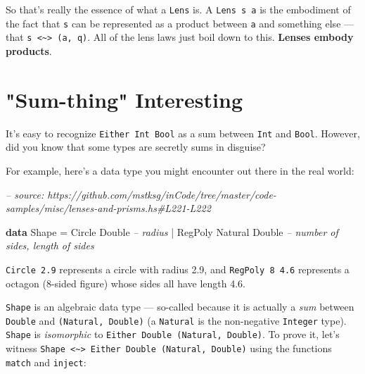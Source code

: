 \documentclass[]{article}
\newenvironment{Shaded}{}{}
\newcommand{\CommentTok}[1]{\textcolor[rgb]{0.38,0.63,0.69}{\textit{#1}}}
\newcommand{\DataTypeTok}[1]{\textcolor[rgb]{0.56,0.13,0.00}{#1}}
\newcommand{\FunctionTok}[1]{\textcolor[rgb]{0.02,0.16,0.49}{#1}}
\newcommand{\KeywordTok}[1]{\textcolor[rgb]{0.00,0.44,0.13}{\textbf{#1}}}
\begin{document}
So that's really the essence of what a \texttt{Lens\textquotesingle{}} is. A
\texttt{Lens\textquotesingle{}\ s\ a} is the embodiment of the fact that
\texttt{s} can be represented as a product between \texttt{a} and something else
--- that \texttt{s\ \textless{}\textasciitilde{}\textgreater{}\ (a,\ q)}. All of
the lens laws just boil down to this. \textbf{Lenses embody products}.

\hypertarget{sum-thing-interesting}{%
\section{"Sum-thing" Interesting}\label{sum-thing-interesting}}

It's easy to recognize \texttt{Either\ Int\ Bool} as a sum between \texttt{Int}
and \texttt{Bool}. However, did you know that some types are secretly sums in
disguise?

For example, here's a data type you might encounter out there in the real world:

\begin{Shaded}
\begin{Highlighting}[]
\CommentTok{-- source: https://github.com/mstksg/inCode/tree/master/code-samples/misc/lenses-and-prisms.hs#L221-L222}

\KeywordTok{data} \DataTypeTok{Shape} \FunctionTok{=} \DataTypeTok{Circle}  \DataTypeTok{Double}           \CommentTok{-- radius}
           \FunctionTok{|} \DataTypeTok{RegPoly} \DataTypeTok{Natural} \DataTypeTok{Double}   \CommentTok{-- number of sides, length of sides}
\end{Highlighting}
\end{Shaded}

\texttt{Circle\ 2.9} represents a circle with radius 2.9, and
\texttt{RegPoly\ 8\ 4.6} represents a octagon (8-sided figure) whose sides all
have length 4.6.

\texttt{Shape} is an algebraic data type --- so-called because it is actually a
\emph{sum} between \texttt{Double} and \texttt{(Natural,\ Double)} (a
\texttt{Natural} is the non-negative \texttt{Integer} type). \texttt{Shape} is
\emph{isomorphic} to \texttt{Either\ Double\ (Natural,\ Double)}. To prove it,
let's witness
\texttt{Shape\ \textless{}\textasciitilde{}\textgreater{}\ Either\ Double\ (Natural,\ Double)}
using the functions \texttt{match} and \texttt{inject}:
\end{document}
